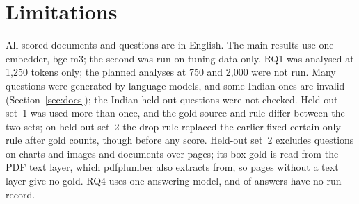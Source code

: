 \section{Limitations}\label{sec:limitations}

All scored documents and questions are in English. The main results use one
embedder, bge-m3; the second was run on tuning data only.  RQ1 was analysed at 1,250 tokens only; the planned analyses at 750 and 2,000
were not run. Many
questions were generated by language models, and some Indian ones are invalid
(Section~\ref{sec:docs}); the Indian held-out questions were not checked.
Held-out set~1 was used more than once, and the gold source and rule differ
between the two sets; on held-out set~2 the drop rule replaced the earlier-fixed
certain-only rule after gold counts, though before any score. Held-out set~2
excludes questions on charts and images and documents over \HTwoMaxPages{}
pages; its box gold is read from the PDF text layer, which pdfplumber also
extracts from, so pages without a text layer give no gold. RQ4 uses one
answering model, and \AQUnrecordedAnswers{} of \AQAnswers{} answers have no run
record. 
